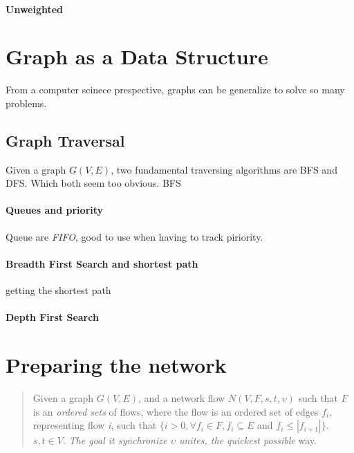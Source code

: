 \documentclass{article}
\begin{document}
\paragraph{Unweighted}

\section{Graph as a Data Structure}


From a computer scinece prespective, graphs can be generalize to solve so many problems.


\subsection{Graph Traversal}

Given a graph $G(V,E)$, two fundamental traversing algorithms are BFS and DFS. Which both seem too obvious. BFS

\paragraph{Queues and priority}
Queue are \textit{FIFO}, good to use when having to track piriority.

\paragraph{Breadth First Search and shortest path}
getting the shortest path

\paragraph{Depth First Search}

\section{Preparing the network}

\begin{quote}
  Given a graph $G(V,E)$, and a network flow $N(V, F, s, t, \upsilon)$ such that $F$ is an \textit{ordered sets} of flows, where the flow is an ordered set of edges $f_i$, representing flow \textit{i}, such that $\{i > 0, \forall f_i \in F, f_i \subseteq E$ and $f_i \leq |f_{i+1}|\}$. $s, t \in V$. \textit{The goal it synchronize $\upsilon$ unites, the quickest possible} way.
\end{quote}
\end{document}
